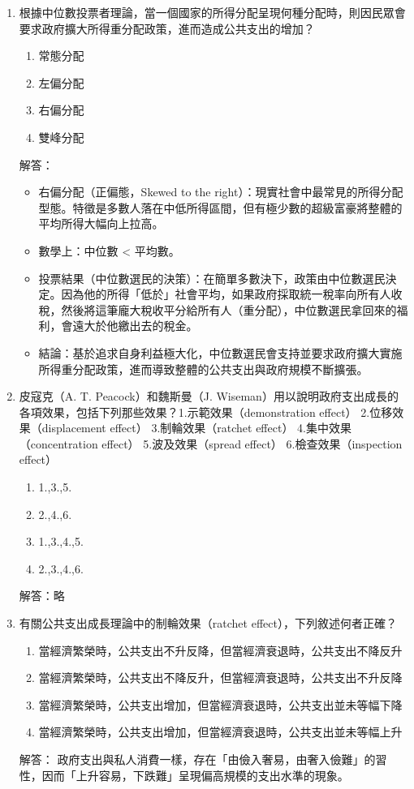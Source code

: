 \documentclass[12pt, a4paper]{article}
\begin{document}
\begin{enumerate}
    \item 根據中位數投票者理論，當一個國家的所得分配呈現何種分配時，則因民眾會要求政府擴大所得重分配政策，進而造成公共支出的增加？
    \begin{enumerate}[label=\Alph*.]
        \item 常態分配
        \item 左偏分配
        \item 右偏分配
        \item 雙峰分配
    \end{enumerate}
    解答：
    \begin{itemize}
        \item 右偏分配（正偏態，Skewed to the right）：現實社會中最常見的所得分配型態。特徵是多數人落在中低所得區間，但有極少數的超級富豪將整體的平均所得大幅向上拉高。
        \item 數學上：中位數 < 平均數。
        \item 投票結果（中位數選民的決策）：在簡單多數決下，政策由中位數選民決定。因為他的所得「低於」社會平均，如果政府採取統一稅率向所有人收稅，然後將這筆龐大稅收平分給所有人（重分配），中位數選民拿回來的福利，會遠大於他繳出去的稅金。
        \item 結論：基於追求自身利益極大化，中位數選民會支持並要求政府擴大實施所得重分配政策，進而導致整體的公共支出與政府規模不斷擴張。
    \end{itemize}

    \item 皮寇克（A. T. Peacock）和魏斯曼（J. Wiseman）用以說明政府支出成長的各項效果，包括下列那些效果？1.示範效果（demonstration effect） 2.位移效果（displacement effect） 3.制輪效果（ratchet effect） 4.集中效果（concentration effect） 5.波及效果（spread effect） 6.檢查效果（inspection effect）
    \begin{enumerate}[label=\Alph*.]
        \item 1.,3.,5.
        \item 2.,4.,6.
        \item 1.,3.,4.,5.
        \item 2.,3.,4.,6.
    \end{enumerate}
    解答：略

    \item 有關公共支出成長理論中的制輪效果（ratchet effect），下列敘述何者正確？
    \begin{enumerate}[label=\Alph*.]
        \item 當經濟繁榮時，公共支出不升反降，但當經濟衰退時，公共支出不降反升
        \item 當經濟繁榮時，公共支出不降反升，但當經濟衰退時，公共支出不升反降
        \item 當經濟繁榮時，公共支出增加，但當經濟衰退時，公共支出並未等幅下降
        \item 當經濟繁榮時，公共支出增加，但當經濟衰退時，公共支出並未等幅上升
    \end{enumerate}
    解答：
    政府支出與私人消費一樣，存在「由儉入奢易，由奢入儉難」的習性，因而「上升容易，下跌難」呈現偏高規模的支出水準的現象。


\end{enumerate}
\end{document}
